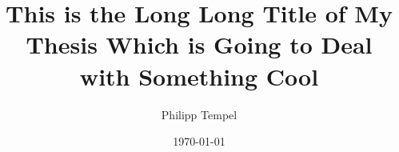 \documentclass[%
  draft,%
  ngerman,%
  english,%
]{iswbook}
\author{Philipp Tempel}
\date{\today}
\title{This is the Long Long Title of My Thesis Which is Going to Deal with Something Cool}
\begin{document}
\frontmatter



\maketitle



\begin{otherlanguage}{ngerman}
 \maketitle
\end{otherlanguage}



\begin{abstract}
  \Blindtext[3]
  
\end{abstract}



\begin{otherlanguage}{ngerman}
  \begin{abstract}
    \Blindtext[3]
       
  \end{abstract}
\end{otherlanguage}



\end{document}
